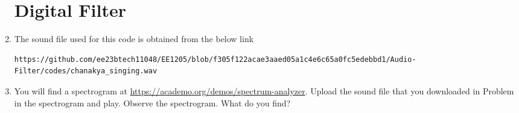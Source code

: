 \documentclass[journal,12pt,twocolumn]{IEEEtran}
\theoremstyle{remark}
\begin{document}
\begin{enumerate}[label=\thesection.\arabic*,ref=\thesection.\theenumi]
\section{Digital Filter}
\label{input_sound}
\item The sound file used for this code is obtained from the below link
\begin{lstlisting}
https://github.com/ee23btech11048/EE1205/blob/f305f122acae3aaed05a1c4e6c65a0fc5edebbd1/Audio-Filter/codes/chanakya_singing.wav
\end{lstlisting}

\item
\label{prob:spectrogram}
You will find a spectrogram at \href{https://academo.org/demos/spectrum-analyzer}{\url{https://academo.org/demos/spectrum-analyzer}}. 
Upload the sound file that you downloaded in Problem  in the spectrogram  and play.  Observe the spectrogram. What do you find?
\\


\end{enumerate}
\end{document}
